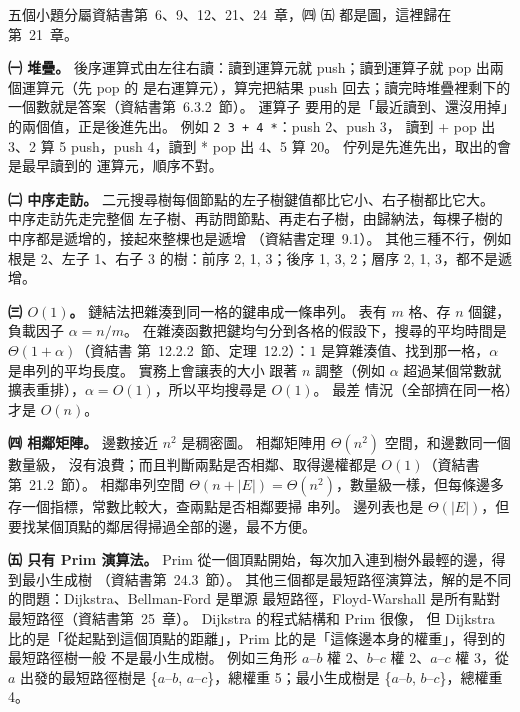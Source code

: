 \begin{pastsoln}
五個小題分屬資結書第~6、9、12、21、24~章，㈣ ㈤ 都是圖，這裡歸在第~21~章。

\textbf{㈠ 堆疊。} 後序運算式由左往右讀：讀到運算元就 push；讀到運算子就 pop 出兩個運算元（先 pop 的
是右運算元），算完把結果 push 回去；讀完時堆疊裡剩下的一個數就是答案（資結書第~6.3.2~節）。 運算子
要用的是「最近讀到、還沒用掉」的兩個值，正是後進先出。 例如 \texttt{2 3 + 4 *}：push 2、push 3，
讀到 + pop 出 3、2 算 5 push，push 4，讀到 * pop 出 4、5 算 20。 佇列是先進先出，取出的會是最早讀到的
運算元，順序不對。

\textbf{㈡ 中序走訪。} 二元搜尋樹每個節點的左子樹鍵值都比它小、右子樹都比它大。 中序走訪先走完整個
左子樹、再訪問節點、再走右子樹，由歸納法，每棵子樹的中序都是遞增的，接起來整棵也是遞增
（資結書定理~9.1）。 其他三種不行，例如根是 2、左子 1、右子 3 的樹：前序 2, 1, 3；後序 1, 3, 2；層序
2, 1, 3，都不是遞增。

\textbf{㈢ $O(1)$。} 鏈結法把雜湊到同一格的鍵串成一條串列。 表有 $m$ 格、存 $n$ 個鍵，負載因子
$\alpha = n/m$。 在雜湊函數把鍵均勻分到各格的假設下，搜尋的平均時間是 $\Theta(1 + \alpha)$（資結書
第~12.2.2~節、定理~12.2）：$1$ 是算雜湊值、找到那一格，$\alpha$ 是串列的平均長度。 實務上會讓表的大小
跟著 $n$ 調整（例如 $\alpha$ 超過某個常數就擴表重排），$\alpha = O(1)$，所以平均搜尋是 $O(1)$。 最差
情況（全部擠在同一格）才是 $O(n)$。

\textbf{㈣ 相鄰矩陣。} 邊數接近 $n^2$ 是稠密圖。 相鄰矩陣用 $\Theta(n^2)$ 空間，和邊數同一個數量級，
沒有浪費；而且判斷兩點是否相鄰、取得邊權都是 $O(1)$（資結書第~21.2~節）。 相鄰串列空間
$\Theta(n + |E|) = \Theta(n^2)$，數量級一樣，但每條邊多存一個指標，常數比較大，查兩點是否相鄰要掃
串列。 邊列表也是 $\Theta(|E|)$，但要找某個頂點的鄰居得掃過全部的邊，最不方便。

\textbf{㈤ 只有 Prim 演算法。} Prim 從一個頂點開始，每次加入連到樹外最輕的邊，得到最小生成樹
（資結書第~24.3~節）。 其他三個都是最短路徑演算法，解的是不同的問題：Dijkstra、Bellman-Ford 是單源
最短路徑，Floyd-Warshall 是所有點對最短路徑（資結書第~25~章）。 Dijkstra 的程式結構和 Prim 很像，
但 Dijkstra 比的是「從起點到這個頂點的距離」，Prim 比的是「這條邊本身的權重」，得到的最短路徑樹一般
不是最小生成樹。 例如三角形 $a$--$b$ 權 2、$b$--$c$ 權 2、$a$--$c$ 權 3，從 $a$ 出發的最短路徑樹是
\{$a$--$b$, $a$--$c$\}，總權重 5；最小生成樹是 \{$a$--$b$, $b$--$c$\}，總權重 4。
\end{pastsoln}
